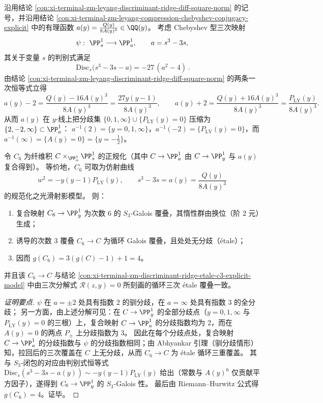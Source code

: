 \begin{conclusion}\label{con:xi-terminal-zm-discriminant-ridge-chebyshev-fiber-product}
沿用结论 \ref{con:xi-terminal-zm-leyang-discriminant-ridge-diff-square-norm} 的记号，并沿用结论 \ref{con:xi-terminal-zm-leyang-compression-chebyshev-conjugacy-explicit} 中的有理函数 \(a(y)=\frac{Q(y)}{8A(y)^3}\in\QQ(y)\)。
考虑 Chebyshev 型三次映射
\[
\psi:\ \PP^1_s\longrightarrow\PP^1_a,\qquad a=s^3-3s,
\]
其关于变量 \(s\) 的判别式满足
\[
\boxed{\ \mathrm{Disc}_{s}\bigl(s^3-3s-a\bigr)=-27\,(a^2-4)\ }.
\]
由结论 \ref{con:xi-terminal-zm-leyang-discriminant-ridge-diff-square-norm} 的两条一次恒等式立得
\[
a(y)-2=\frac{Q(y)-16A(y)^3}{8A(y)^3}=\frac{27y(y-1)}{8A(y)^3},
\qquad
a(y)+2=\frac{Q(y)+16A(y)^3}{8A(y)^3}=\frac{P_{\mathrm{LY}}(y)}{8A(y)^3}.
\]
从而 \(a(y)\) 在 \(y\)-线上把分歧集
\(
\{0,1,\infty\}\cup\{P_{\mathrm{LY}}(y)=0\}
\)
压缩为 \(\{2,-2,\infty\}\subset\PP^1_a\)：
\(a^{-1}(2)=\{y=0,1,\infty\}\)，\(a^{-1}(-2)=\{P_{\mathrm{LY}}(y)=0\}\)，而 \(a^{-1}(\infty)=\{A(y)=0\}=\{y=-\tfrac12\}\)。
\par
令 \(C_6\) 为纤维积 \(C\times_{\PP^1_a}\PP^1_s\) 的正规化（其中 \(C\to\PP^1_a\) 由 \(C\to\PP^1_y\) 与 \(a(y)\) 复合得到）。
等价地，\(C_6\) 可取为仿射曲线
\[
w^{2}=-y(y-1)P_{\mathrm{LY}}(y),\qquad s^{3}-3s=a(y)=\frac{Q(y)}{8A(y)^{3}}
\]
的规范化之光滑射影模型。
则：
\begin{enumerate}
  \item 复合映射 \(C_6\to\PP^1_y\) 为次数 \(6\) 的 \(S_3\)-Galois 覆叠，其惰性群由换位（阶 \(2\) 元）生成；
  \item 诱导的次数 \(3\) 覆叠 \(C_6\to C\) 为循环 Galois 覆叠，且处处无分歧（\'etale）；
  \item 因而 \(g(C_6)=3(g(C)-1)+1=4\)。
\end{enumerate}
并且该 \(C_6\to C\) 与结论 \ref{con:xi-terminal-zm-discriminant-ridge-etale-c3-explicit-model} 中由三次分解式 \(\mathscr R(z,y)=0\) 所刻画的循环三次 \'etale 覆叠一致。
\end{conclusion}
\begin{proof}[证明要点]
\(\psi\) 在 \(a=\pm 2\) 处具有指数 \(2\) 的驯分歧，在 \(a=\infty\) 处具有指数 \(3\) 的全分歧；
另一方面，由上述分解可见：在 \(C\to\PP^1_y\) 的全部分歧点（\(y=0,1,\infty\) 与 \(P_{\mathrm{LY}}(y)=0\) 的三根）上，复合映射 \(C\to\PP^1_a\) 的分歧指数均为 \(2\)，而在 \(A(y)=0\) 的两点 \(P_\pm\) 上分歧指数为 \(3\)。
因此在每个分歧点处，复合映射 \(C\to\PP^1_a\) 的分歧指数与 \(\psi\) 的分歧指数相同；由 Abhyankar 引理（驯分歧情形）知，拉回后的三次覆盖在 \(C\) 上无分歧，从而 \(C_6\to C\) 为 \'etale 循环三重覆盖。
其与 \(S_3\)-闭包的对应由判别式恒等式
\(
\mathrm{Disc}_{s}(s^3-3s-a(y))\sim -y(y-1)P_{\mathrm{LY}}(y)
\)
给出（常数与 \(A(y)^6\) 仅贡献平方因子），遂得到 \(C_6\to\PP^1_y\) 的 \(S_3\)-Galois 性。
最后由 Riemann--Hurwitz 公式得 \(g(C_6)=4\)。证毕。
\end{proof}

